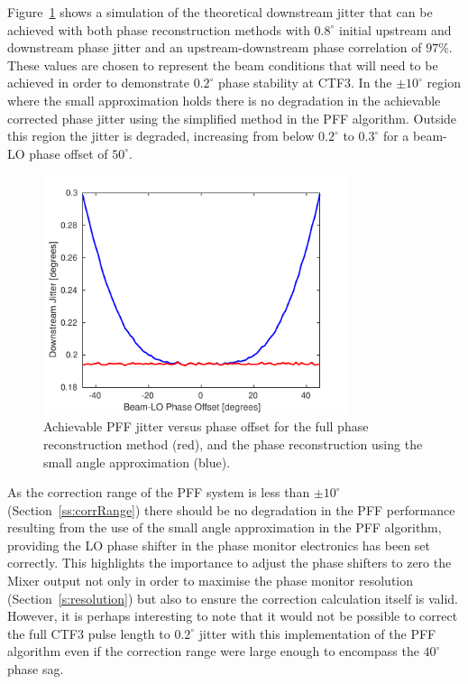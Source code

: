 Figure~\ref{f:phaseRecJitSim} shows a simulation of the theoretical downstream jitter that can be achieved with both phase reconstruction methods with \(0.8^\circ\) initial upstream and downstream phase jitter and an upstream-downstream phase correlation of \(97\%\). These values are chosen to represent the beam conditions that will need to be achieved in order to demonstrate \(0.2^\circ\) phase stability at CTF3. In the \(\pm10^\circ\) region where the small approximation holds there is no degradation in the achievable corrected phase jitter using the simplified method in the PFF algorithm. Outside this region the jitter is degraded, increasing from below \(0.2^\circ\) to \(0.3^\circ\) for a beam-LO phase offset of \(50^\circ\). 

\begin{figure}
  \centering
  \includegraphics[width=0.8\textwidth]{Figures/commissioning/phaseRecJitSim}
  \caption{Achievable PFF jitter versus phase offset for the full phase reconstruction method (red), and the phase reconstruction using the small angle approximation (blue).}
  \label{f:phaseRecJitSim}
\end{figure}

As the correction range of the PFF system is less than \(\pm10^\circ\) (Section~\ref{ss:corrRange}) there should be no degradation in the PFF performance resulting from the use of the small angle approximation in the PFF algorithm, providing the LO phase shifter in the phase monitor electronics has been set correctly. This highlights the importance to adjust the phase shifters to zero the Mixer output not only in order to maximise the phase monitor resolution (Section~\ref{s:resolution}) but also to ensure the correction calculation itself is valid. However, it is perhaps interesting to note that it would not be possible to correct the full CTF3 pulse length to \(0.2^\circ\) jitter with this implementation of the PFF algorithm even if the correction range were large enough to encompass the \(40^\circ\) phase sag.

